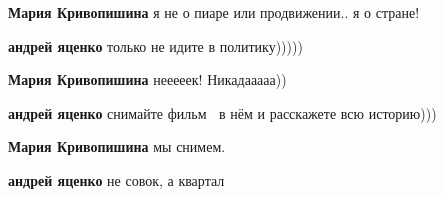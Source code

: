 \begin{itemize}
\begin{itemize}
 
\textbf{Мария Кривопишина} я не о пиаре или продвижении.. я о стране!

 
\textbf{андрей яценко} только не идите в политику)))))

 
\textbf{Мария Кривопишина} нееееек! Никадааааа))

 
\textbf{андрей яценко} снимайте фильм💪🏻 в нём и расскажете всю историю)))

 
\textbf{Мария Кривопишина} мы снимем.

 
\textbf{андрей яценко} не совок, а квартал
\end{itemize}

 

\end{itemize}
